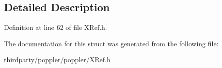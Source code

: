 \subsection{Detailed Description}


Definition at line 62 of file X\+Ref.\+h.



The documentation for this struct was generated from the following file\+:\begin{DoxyCompactItemize}
\item 
thirdparty/poppler/poppler/X\+Ref.\+h\end{DoxyCompactItemize}
